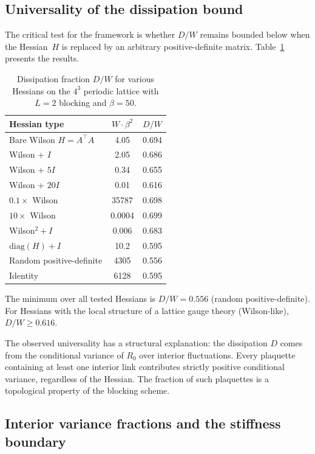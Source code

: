 \documentclass[11pt]{article}
\theoremstyle{definition}
\begin{document}
\subsection{Universality of the dissipation bound}

The critical test for the framework is whether $D/W$ remains bounded 
below when the Hessian~$H$ is replaced by an arbitrary positive-definite 
matrix.  Table~\ref{tab:gap_c} presents the results.

\begin{table}[h]
\centering
\caption{Dissipation fraction $D/W$ for various Hessians on the 
$4^3$ periodic lattice with $L = 2$ blocking and $\beta = 50$.}
\label{tab:gap_c}
\begin{tabular}{lcc}
\toprule
Hessian type & $W \cdot \beta^2$ & $D/W$ \\
\midrule
Bare Wilson $H = A^\top A$ & 4.05 & 0.694 \\
Wilson + $I$ & 2.05 & 0.686 \\
Wilson + $5I$ & 0.34 & 0.655 \\
Wilson + $20I$ & 0.01 & 0.616 \\
$0.1 \times$ Wilson & 35787 & 0.698 \\
$10 \times$ Wilson & 0.0004 & 0.699 \\
Wilson$^2 + I$ & 0.006 & 0.683 \\
$\mathrm{diag}(H) + I$ & 10.2 & 0.595 \\
Random positive-definite & 4305 & 0.556 \\
Identity & 6128 & 0.595 \\
\bottomrule
\end{tabular}
\end{table}

The minimum over all tested Hessians is $D/W = 0.556$ (random 
positive-definite).  For Hessians with the local structure of a lattice 
gauge theory (Wilson-like), $D/W \geq 0.616$.

The observed universality has a structural explanation: the dissipation 
$D$ comes from the conditional variance of $R_0$ over interior 
fluctuations.  Every plaquette containing at least one interior link 
contributes strictly positive conditional variance, regardless of the 
Hessian.  The fraction of such plaquettes is a topological property of 
the blocking scheme.

\subsection{Interior variance fractions and the stiffness boundary}
\end{document}
